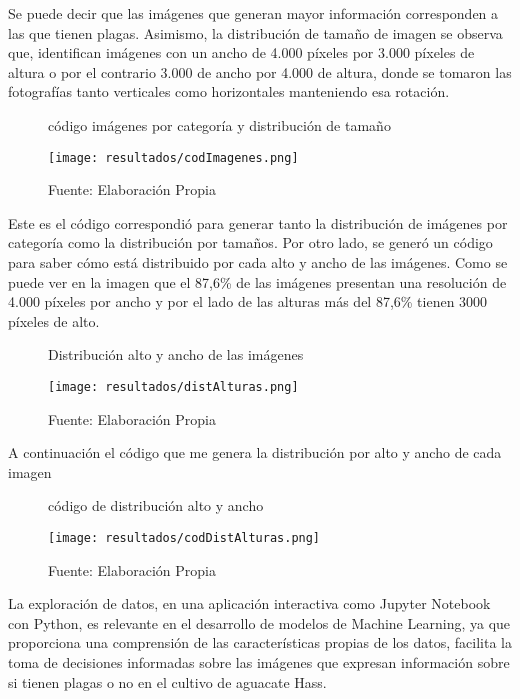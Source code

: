 Se puede decir que las imágenes que generan mayor información corresponden a las que tienen plagas. Asimismo, la distribución de tamaño de imagen se observa que, identifican imágenes con un ancho de 4.000 píxeles por 3.000 píxeles de altura o por el contrario 3.000 de ancho por 4.000 de altura, donde se tomaron las fotografías tanto verticales como horizontales manteniendo esa rotación.

\newpage

\begin{figure}[h]
\centering
\caption{código imágenes por categoría y distribución de tamaño}
\texttt{[image: resultados/codImagenes.png]}
\caption*{\footnotesize Fuente: Elaboración Propia}
\label{fig:figuraCodImagenes}
\end{figure}

Este es el código correspondió para generar tanto la distribución de imágenes por categoría como la distribución por tamaños. 
Por otro lado, se generó un código para saber cómo está distribuido por cada alto y ancho de las imágenes. Como se puede ver en la imagen que el 87,6\% de las imágenes presentan una resolución de 4.000 píxeles por ancho y por el lado de las alturas más del 87,6\% tienen 3000 píxeles de alto.

\newpage

\begin{figure}[h]
\centering
\caption{Distribución alto y ancho de las imágenes}
\texttt{[image: resultados/distAlturas.png]}
\caption*{\footnotesize Fuente: Elaboración Propia}
\label{fig:figuraDistAlturas}
\end{figure}

A continuación el código que me genera la distribución por alto y ancho de cada imagen

\newpage

\begin{figure}[h]
\centering
\caption{código de distribución alto y ancho}
\texttt{[image: resultados/codDistAlturas.png]}
\caption*{\footnotesize Fuente: Elaboración Propia}
\label{fig:figuraCodDistAlturas}
\end{figure}

La exploración de datos, en una aplicación interactiva como Jupyter Notebook con Python, es relevante en el desarrollo de modelos de Machine Learning, ya que proporciona una comprensión de las características propias de los datos, facilita la toma de decisiones informadas sobre las imágenes que expresan información sobre si tienen plagas o no en el cultivo de aguacate Hass.

